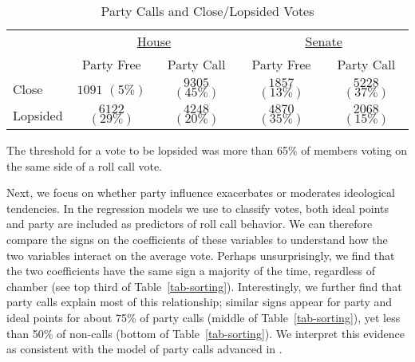 \documentclass[12pt]{article}
\begin{document}
\begin{table}[!htbp]
\centering
\begin{threeparttable}
\singlespacing
\caption{Party Calls and Close/Lopsided Votes}
\label{tab-close-lop}
\begin{tabular}{l cc|cc}
\hline
&\multicolumn{2}{c}{\underline{House}}&\multicolumn{2}{c}{\underline{Senate}}\\
         & Party Free      & Party Call      & Party Free      & Party Call      \\
\hline
Close    & $1091$ $( 5\%)$& $9305$ $(45\%)$& $1857$ $(13\%)$& $5228$ $(37\%)$\\
Lopsided & $6122$ $(29\%)$& $4248$ $(20\%)$& $4870$ $(35\%)$& $2068$ $(15\%)$\\
\hline
\end{tabular}
\begin{tablenotes}
   \item
   The threshold for a vote to be lopsided was more than 65\% of members voting on the same side of a roll call vote.
 \end{tablenotes}
\end{threeparttable}
\end{table}

Next, we focus on whether party influence exacerbates or moderates ideological tendencies.  In the regression models we use to classify votes, both ideal points and party are included as predictors of roll call behavior.  We can therefore compare the signs on the coefficients of these variables to understand how the two variables interact on the average vote.  Perhaps unsurprisingly, we find that the two coefficients have the same sign a majority of the time, regardless of chamber (see top third of Table~\ref{tab-sorting}).  Interestingly, we further find that party calls explain most of this relationship; similar signs appear for party and ideal points for about 75\% of party calls (middle of Table~\ref{tab-sorting}), yet less than 50\% of non-calls (bottom of Table~\ref{tab-sorting}).
We interpret this evidence as consistent with the model of party calls advanced in \cite{Minozzi:2013}.
\end{document}
